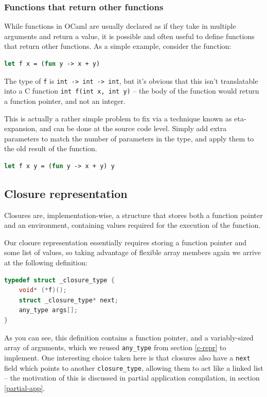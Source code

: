 \documentclass[12pt,a4paper,twoside,openright]{report}
\begin{document}
\subsubsection{Functions that return other functions} \label{incomplete-funcs}

While functions in OCaml are usually declared as if they take in multiple 
arguments and return a value, it is possible and often useful to define 
functions that return other functions. As a simple example, consider the 
function:

\begin{lstlisting}[language=Caml]
let f x = (fun y -> x + y)
\end{lstlisting}

The type of \texttt{f} is \texttt{int -> int -> int}, but it's obvious that 
this isn't translatable into a C function \texttt{int f(int x, int y)} -- the 
body of the function would return a function pointer, and not an integer.

This is actually a rather simple problem to fix via a technique known as 
eta-expansion, and can be done at the source code level. Simply add extra 
parameters to match the number of parameters in the type, and apply them to the 
old result of the function.

\begin{lstlisting}[language=Caml]
let f x y = (fun y -> x + y) y
\end{lstlisting}

\subsection{Closure representation}

Closures are, implementation-wise, a structure that stores both a function 
pointer and an environment, containing values required for the execution of the 
function.

Our closure representation essentially requires storing a function pointer and 
some list of values, so taking advantage of flexible array members again we 
arrive at the following definition:

\begin{lstlisting}[language=C]
typedef struct _closure_type {
    void* (*f)();
    struct _closure_type* next;
    any_type args[];
}
\end{lstlisting}

As you can see, this definition contains a function pointer, and a 
variably-sized array of arguments, which we reused \verb|any_type| from section 
\ref{c-repr} to implement. One interesting choice taken here is that closures 
also have a \texttt{next} field which points to another \verb|closure_type|, 
allowing them to act like a linked list -- the motivation of this is discussed 
in partial application compilation, in section \ref{partial-app}.
\end{document}
